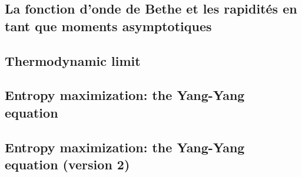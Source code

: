 \subsection{La fonction d'onde de Bethe et les rapidités en tant que moments asymptotiques}


\subsection{Thermodynamic limit}


\subsection{Entropy maximization: the Yang-Yang equation}


\subsection{Entropy maximization: the Yang-Yang equation (version 2) }



